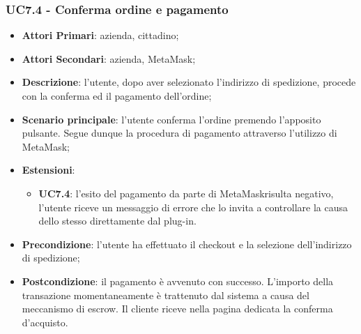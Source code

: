 \subsubsection{UC7.4 - Conferma ordine e pagamento}
\begin{itemize}
	\item \textbf{Attori Primari}: azienda, cittadino;
	\item \textbf{Attori Secondari}: azienda, MetaMask\glo;
	\item \textbf{Descrizione}: l'utente, dopo aver selezionato l'indirizzo di spedizione, procede con la conferma ed il pagamento dell'ordine;
	\item \textbf{Scenario principale}: l'utente conferma l'ordine premendo l'apposito pulsante. Segue dunque la procedura di pagamento attraverso l'utilizzo di MetaMask\glo;
	\item \textbf{Estensioni}: 
	\begin{itemize}
		\item \textbf{UC7.4}: l'esito del pagamento da parte di MetaMask\glosp risulta negativo, l'utente riceve un messaggio di errore che lo invita a controllare la causa dello stesso direttamente dal plug-in\glo. 
	\end{itemize}
	\item \textbf{Precondizione}: l'utente ha effettuato il checkout e la selezione dell'indirizzo di spedizione;
	\item \textbf{Postcondizione}: il pagamento è avvenuto con successo. 
	L'importo della transazione momentaneamente è trattenuto dal sistema a 
	causa del meccanismo di escrow\glo. Il cliente riceve nella pagina dedicata 
	la conferma d'acquisto\glo.
\end{itemize}


